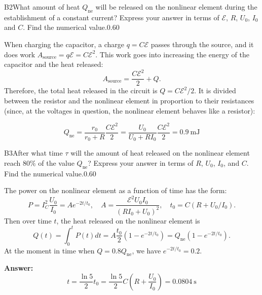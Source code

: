 \documentclass[11pt,a4paper]{article}
\begin{document}
\begin{solcard}{B2}{What amount of heat $Q_\text{ne}$ will be released on the nonlinear element during the establishment of a constant current? Express your answer in terms of $\mathcal{E}$, $R$, $U_0$, $I_0$ and $C$. Find the numerical value.}{0.60}

When charging the capacitor, a charge $q = C\mathcal{E}$ passes through the source, and it does work $A_{\text{source}}  = q \mathcal{E} = C \mathcal{E}^2$. This work goes into increasing the energy of the capacitor and the heat released: $$ A_{\text{source}}  = \frac{C \mathcal{E}^2}{2} + Q. $$Therefore, the total heat released in the circuit is $Q = C \mathcal{E}^2/2$. It is divided between the resistor and the nonlinear element in proportion to their resistances (since, at the voltages in question, the nonlinear element behaves like a resistor):

$$ Q_{\text{ne}} = \frac{r_0}{r_0 + R} \frac{C \mathcal{E}^2}{2} = \frac{U_0}{U_0 + R I_0} \frac{C \mathcal{E}^2}{2} = 0.9~\mathrm{mJ} $$

\end{solcard}

\begin{solcard}{B3}{After what time $\tau$ will the amount of heat released on the nonlinear element reach $80\%$ of the value $Q_\text{ne}$? Express your answer in terms of $R$, $U_0$, $I_0$, and $C$. Find the numerical value.}{0.60}

The power on the nonlinear element as a function of time has the form: $$ P = I_C^2 \frac{U_0}{I_0} = A e^{- 2t/t_0}, \quad A = \frac{\mathcal{E}^2 U_0 I_0}{(R I_0 + U_0)^2}, \quad t_0 = C(R + U_0/I_0). $$Then over time $t$, the heat released on the nonlinear element is $$ Q(t) = \int_0 ^t P(t) dt = A \frac{t_0}{2} \left( 1 - e^{- 2t/t_0}\right) = Q_{\text{ne}} \left( 1 - e^{- 2t/t_0}\right). $$At the moment in time when $Q = 0.8 Q_{\text{ne}}$, we have $e^{-2t/t_0} = 0.2$.

\par\smallskip\noindent\textbf{Answer:} $$ t = \frac{\ln 5}{2} t_0 =  \frac{\ln 5}{2} C \left(R + \frac{U_0}{I_0}\right) = 0.0804~\mathrm{s} $$
\end{solcard}
\end{document}
